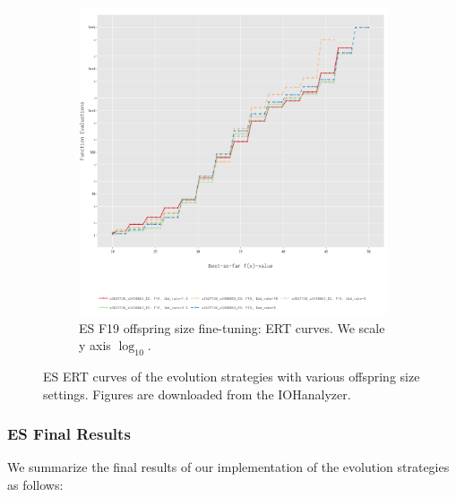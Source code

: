 \documentclass{article}
\begin{document}
\begin{figure}[!ht]
\begin{subfigure}[h]{0.95\linewidth}
        \includegraphics[width=\linewidth]{es/f19/ERT19lbd.png}
        \caption{ES F19 offspring size fine-tuning: ERT curves. We scale y axis $\log_{10}$.}
    \end{subfigure}
    \caption{ES ERT curves of the evolution strategies with various offspring size settings. Figures are downloaded from the IOHanalyzer.}
    \label{fig:experi-es-osize-ert}
\end{figure}

\subsubsection{ES Final Results}
We summarize the final results of our implementation of the evolution strategies as follows:
\end{document}

